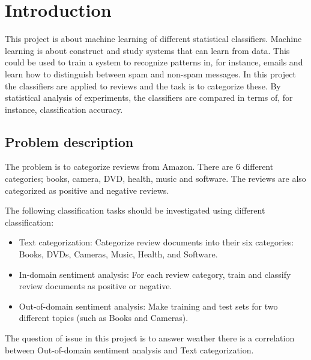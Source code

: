 \chapter{Introduction}
This project is about machine learning of different statistical classifiers.
Machine learning is about construct and study systems that can learn from data.
This could be used to train a system to recognize patterns in, for instance, emails and learn how to distinguish between spam and non-spam messages. In this project the classifiers are applied to reviews and the task is to categorize these.
By statistical analysis of experiments, the classifiers are compared in terms of, for instance, classification accuracy.
\section{Problem description}
The problem is to categorize reviews from Amazon. There are 6 different categories;
books, camera, DVD, health, music and software. The reviews are also
categorized as positive and negative reviews. 



The following classification tasks should be investigated using different classification:
\begin{itemize}
\item Text categorization: Categorize review documents into their six categories: Books, DVDs, Cameras, Music, Health, and Software.
\item In-domain sentiment analysis: For each review category, train and classify review documents as positive or negative. 
\item  Out-of-domain sentiment analysis: Make training and test sets for two different topics (such as Books and Cameras).
\end{itemize}
The question of issue in this project is to answer weather there is a correlation between Out-of-domain sentiment analysis and Text categorization. 


